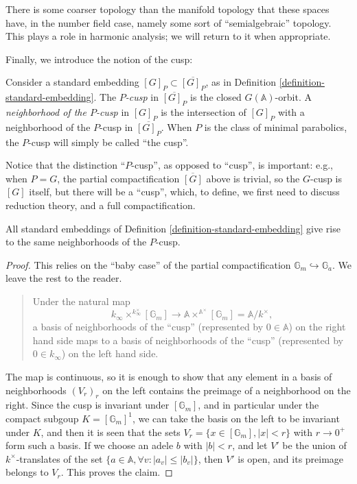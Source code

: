 There is some coarser topology than the manifold topology that these spaces have, in the number field case, namely some sort of ``semialgebraic'' topology. This plays a role in harmonic analysis; we will return to it when appropriate.

Finally, we introduce the notion of the cusp:
\begin{definition}
 \label{definition-P-cusp}
 Consider a standard embedding $[G]_P \subset \overline{[G]_P}$, as in Definition \ref{definition-standard-embedding}. The {\it $P$-cusp} in $\overline{[G]_P}$ is the closed $G(\mathbb A)$-orbit. A {\it neighborhood of the $P$-cusp} in $[G]_P$ is the intersection of $[G]_P$ with a neighborhood of the $P$-cusp in $\overline{[G]_P}$. When $P$ is the class of minimal parabolics, the $P$-cusp will simply be called ``the cusp''. 
\end{definition}

Notice that the distinction ``$P$-cusp'', as opposed to ``cusp'', is important: e.g., when $P=G$, the partial compactification $\overline{[G]}$ above is trivial, so the $G$-cusp is $[G]$ itself, but there will be a ``cusp'', which, to define, we first need to discuss reduction theory, and a full compactification. 

\begin{lemma}
\label{lemma-definitions-cusp-equivalent}
All standard embeddings of Definition \ref{definition-standard-embedding} give rise to the same neighborhoods of the $P$-cusp.
\end{lemma}


\begin{proof}
This relies on the ``baby case'' of the partial compactification $\mathbb G_m\hookrightarrow \mathbb G_a$. We leave the rest to the reader.


 \begin{quote}
Under the natural map 
$$ k_\infty \times^{k_\infty^\times} [\mathbb G_m] \to \mathbb A \times^{\mathbb A^\times} [\mathbb G_m] = \mathbb A/k^\times,$$
a basis of neighborhoods of the ``cusp'' (represented by $0\in \mathbb A$) on the right hand side maps to a basis of neighborhoods of the ``cusp'' (represented by $0\in k_\infty$) on the left hand side.
\end{quote}

The map is continuous, so it is enough to show that any element in a basis of neighborhoods $(V_r)_r$ on the left contains the preimage of a neighborhood on the right. Since the cusp is invariant under $[\mathbb G_m]$, and in particular under the compact subgoup $K=[\mathbb G_m]^1$, we can take the basis on the left to be invariant under $K$, and then it is seen that the sets $V_r = \{ x\in [\mathbb G_m], |x|<r\}$  with $r\to 0^+$ form such a basis. If we choose an adele $b$ with $|b|<r$, and let $V'$ be the union of $k^\times$-translates of the set $\{a \in \mathbb A, \forall v:  |a_v|\le |b_v|\}$, then $V'$ is open, and its preimage belongs to $V_r$. This proves the claim. 

\end{proof}




